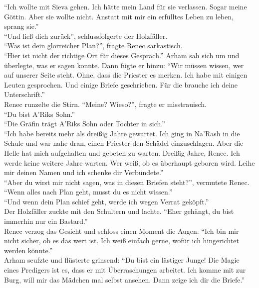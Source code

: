 ``Ich wollte mit Sieva gehen. Ich hätte mein Land für sie verlassen. Sogar meine Göttin. Aber sie 
wollte nicht. Anstatt mit mir ein erfülltes Leben zu leben, sprang sie.''\\
``Und ließ dich zurück'', schlussfolgerte der Holzfäller.\\
``Was ist dein glorreicher Plan?'', fragte Renec sarkastisch.\\
``Hier ist nicht der richtige Ort für dieses Gespräch.'' Arham sah sich um und überlegte, was er 
sagen konnte. Dann fügte er hinzu: ``Wir müssen wissen, wer auf unserer Seite steht. Ohne, dass 
die Priester es merken. Ich habe mit einigen Leuten gesprochen. Und einige Briefe geschrieben. Für 
die brauche ich deine Unterschrift.''\\
Renec runzelte die Stirn. ``Meine? Wieso?'', fragte er misstrauisch.\\
``Du bist A'Riks Sohn.''\\
``Die Gräfin trägt A'Riks Sohn oder Tochter in sich.''\\
``Ich habe bereits mehr als dreißig Jahre gewartet. Ich ging in Na'Rash in die Schule und war nahe 
dran, einen Priester den Schädel einzuschlagen. Aber die Helle hat mich aufgehalten und gebeten zu 
warten. Dreißig Jahre, Renec. Ich werde keine weitere Jahre warten. Wer weiß, ob es überhaupt 
geboren wird. Leihe mir deinen Namen und ich schenke dir Verbündete.''\\
``Aber du wirst mir nicht sagen, was in diesen Briefen steht?'', vermutete Renec.\\
``Wenn alles nach Plan geht, musst du es nicht wissen.''\\
``Und wenn dein Plan schief geht, werde ich wegen Verrat geköpft.''\\
Der Holzfäller zuckte mit den Schultern und lachte. ``Eher gehängt, du bist immerhin nur ein 
Bastard.''\\
Renec verzog das Gesicht und schloss einen Moment die Augen. ``Ich bin mir nicht sicher, ob es das 
wert ist. Ich weiß einfach gerne, wofür ich hingerichtet werden könnte.''\\
Arham seufzte und flüsterte grinsend: ``Du bist ein lästiger Junge! Die Magie eines Predigers ist 
es, dass er mit Überraschungen arbeitet. Ich komme mit zur Burg, will mir das Mädchen mal selbst 
ansehen. Dann zeige ich dir die Briefe.''\\


